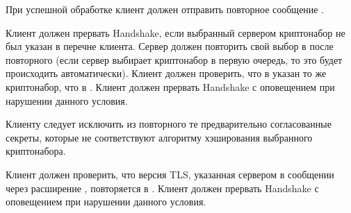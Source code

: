 
При успешной обработке  клиент должен отправить 
повторное сообщение . 

Клиент должен прервать Handshake, если выбранный сервером криптонабор не был 
указан в перечне клиента. 
%
Сервер должен повторить свой выбор в  после 
повторного  (если сервер выбирает криптонабор в 
первую очередь, то это будет происходить автоматически). 
%
Клиент должен проверить, что в  указан то же
криптонабор, что в . Клиент должен прервать Handshake с
оповещением  при нарушении данного
условия.

Клиенту следует исключить из повторного  те 
предварительно согласованные секреты, которые не соответствуют алгоритму 
хэширования выбранного криптонабора.


Клиент должен проверить, что версия TLS, указанная сервером в сообщении 
 через расширение 
, повторяется в 
. Клиент должен прервать Handshake с оповещением 
 при нарушении данного условия.



